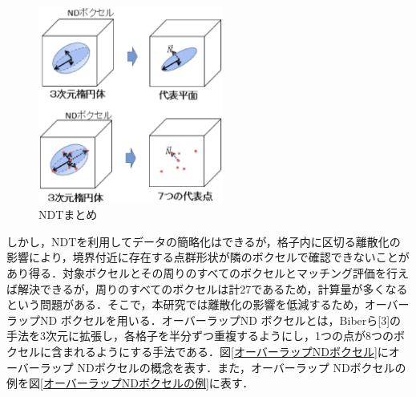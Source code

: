 %
\begin{figure}[htbp]
  \vspace{-3mm}
  \begin{center}
   \includegraphics[height=65mm]{figure/NDTまとめ.eps}
   \vspace{-5mm}
   \caption{NDTまとめ}
   \label{NDTまとめ}
  \end{center}
\end{figure}
%

\newpage
%
しかし，NDTを利用してデータの簡略化はできるが，格子内に区切る離散化の影響により，境界付近に存在する点群形状が隣のボクセルで確認できないことがあり得る．対象ボクセルとその周りのすべてのボクセルとマッチング評価を行えば解決できるが，周りのすべてのボクセルは計27であるため，計算量が多くなるという問題がある．そこで，本研究では離散化の影響を低減するため，オーバーラップND ボクセルを用いる．オーバーラップND ボクセルとは，Biberら[3]の手法を3次元に拡張し，各格子を半分ずつ重複するようにし，1つの点が8つのボクセルに含まれるようにする手法である．図{\ref{オーバーラップNDボクセル}}にオーバーラップ NDボクセルの概念を表す．また，オーバーラップ NDボクセルの例を図{\ref{オーバーラップNDボクセルの例}}に表す．


